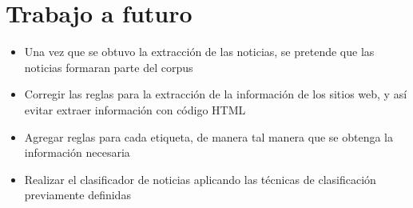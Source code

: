 \section{Trabajo a futuro}
\begin{itemize}
  \item Una vez que se obtuvo la extracción de las noticias, se pretende que las noticias formaran parte del corpus
  \item Corregir las reglas para la extracción de la información de los sitios web, y así evitar extraer información con código HTML
  \item Agregar reglas para cada etiqueta, de manera tal manera que se obtenga la información necesaria
  \item Realizar el clasificador de noticias aplicando las técnicas de clasificación previamente definidas
\end{itemize}
